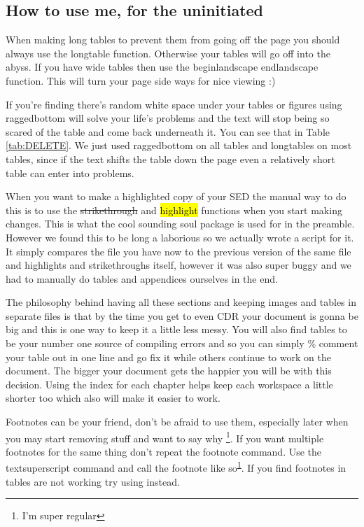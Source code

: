 \subsection{How to use me, for the uninitiated}

When making long tables to prevent them from going off the page you should always use the longtable function. Otherwise your tables will go off into the abyss. If you have wide tables then use the begin{landscape} end{landscape} function. This will turn your page side ways for nice viewing :)

If you're finding there's random white space under your tables or figures using raggedbottom will solve your life's problems and the text will stop being so scared of the table and come back underneath it. You can see that in Table \ref{tab:DELETE}. We just used raggedbottom on all tables and longtables on most tables, since if the text shifts the table down the page even a relatively short table can enter into problems.

When you want to make a highlighted copy of your SED the manual way to do this is to use the \st{strikethrough} and \hl{highlight} functions when you start making changes. This is what the cool sounding soul package is used for in the preamble. However we found this to be long a laborious so we actually wrote a script for it. It simply compares the file you have now to the previous version of the same file and highlights and strikethroughs itself, however it was also super buggy and we had to manually do tables and appendices ourselves in the end.

The philosophy behind having all these sections and keeping images and tables in separate files is that by the time you get to even CDR your document is gonna be big and this is one way to keep it a little less messy. You will also find tables to be your number one source of compiling errors and so you can simply \% comment your table out in one line and go fix it while others continue to work on the document. The bigger your document gets the happier you will be with this decision. Using the index for each chapter helps keep each workspace a little shorter too which also will make it easier to work.

Footnotes can be your friend, don't be afraid to use them, especially later when you may start removing stuff and want to say why \footnote{I'm super regular\label{fn:footnote}}. If you want multiple footnotes for the same thing don't repeat the footnote command. Use the textsuperscript command and call the footnote like so\textsuperscript{\ref{fn:footnote}}. If you find footnotes in tables are not working try using  instead.


